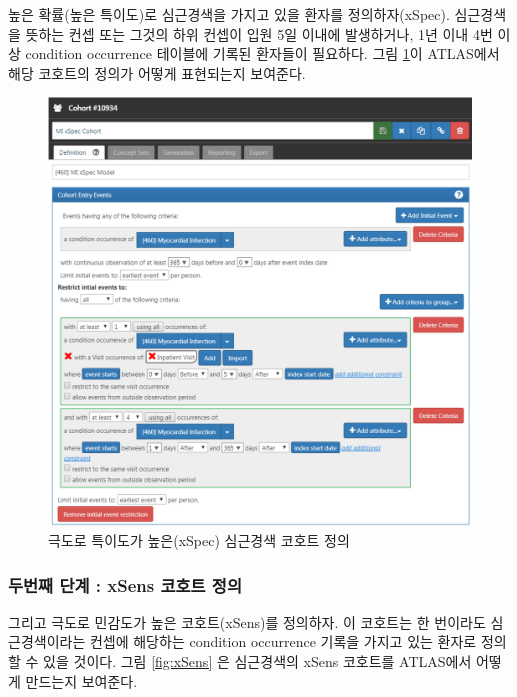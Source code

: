 \documentclass[11pt]{book}
\theoremstyle{definition}
\theoremstyle{definition}
\theoremstyle{definition}
\theoremstyle{remark}
\begin{document}
높은 확률(높은 특이도)로 심근경색을 가지고 있을 환자를 정의하자(xSpec).
심근경색을 뜻하는 컨셉 또는 그것의 하위 컨셉이 입원 5일 이내에
발생하거나, 1년 이내 4번 이상 condition occurrence 테이블에 기록된
환자들이 필요하다. 그림 \ref{fig:xSpec}이 ATLAS에서 해당 코호트의 정의가
어떻게 표현되는지 보여준다. 

\begin{figure}

{\centering \includegraphics[width=1\linewidth]{images/ClinicalValidity/xSpec} 

}

\caption{극도로 특이도가 높은(xSpec) 심근경색 코호트 정의}\label{fig:xSpec}
\end{figure}

\subsubsection*{두번째 단계 : xSens 코호트 정의}\label{--xsens--}

그리고 극도로 민감도가 높은 코호트(xSens)를 정의하자. 이 코호트는 한
번이라도 심근경색이라는 컨셉에 해당하는 condition occurrence 기록을
가지고 있는 환자로 정의할 수 있을 것이다. 그림 \ref{fig:xSens} 은
심근경색의 xSens 코호트를 ATLAS에서 어떻게 만드는지 보여준다.
\end{document}
